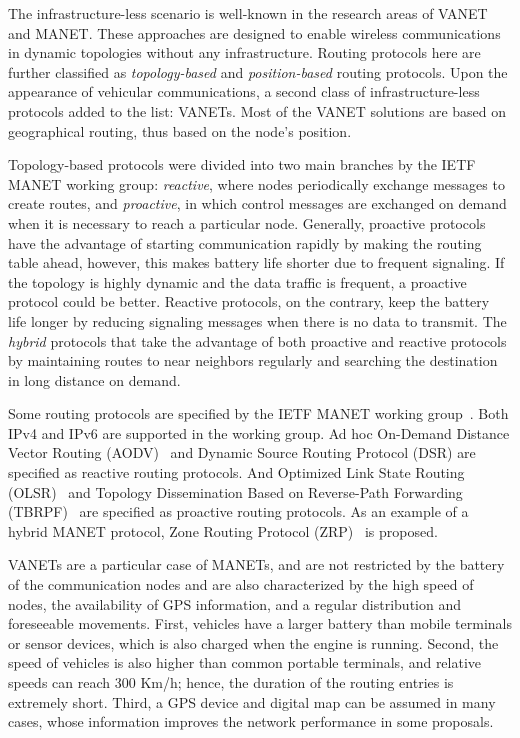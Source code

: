 \documentclass[fonts]{icst}
\begin{document}
The infrastructure-less scenario is well-known in the research areas of VANET and MANET. These approaches are designed to enable wireless
communications in dynamic topologies without any infrastructure. Routing
protocols here are further classified as \textit{topology-based} and
\textit{position-based} routing protocols. Upon the appearance of vehicular
communications, a second class of infrastructure-less protocols added to the
list: VANETs. Most of the VANET solutions are based on geographical routing,
thus based on the node's position. 

Topology-based protocols were divided into two main branches by the IETF MANET
working group: \textit{reactive}, where nodes periodically exchange messages to
create routes, and \textit{proactive}, in which control messages are exchanged on
demand when it is necessary to reach a particular node. Generally, proactive
protocols have the advantage of starting communication rapidly by making the
routing table ahead, however, this makes battery life shorter due to frequent
signaling. If the topology is highly dynamic and the data traffic is frequent, a
proactive protocol could be better. Reactive protocols, on the contrary, keep
the battery life longer by reducing signaling messages when there is no data to
transmit. The \textit{hybrid} protocols that take the advantage of both
proactive and reactive protocols by maintaining routes to near
neighbors regularly and searching the destination in long distance on demand.

Some routing protocols are specified by the IETF MANET working group~\cite{manetwg}.
Both IPv4 and IPv6 are supported in the working group. Ad hoc On-Demand Distance
Vector Routing (AODV)~\cite{rfc3561} and Dynamic Source Routing Protocol (DSR)
\cite{rfc4728} are specified as reactive routing protocols. And Optimized Link
State Routing (OLSR)~\cite{rfc3626} and Topology Dissemination Based on
Reverse-Path Forwarding (TBRPF)~\cite{rfc3684} are specified as proactive
routing protocols. As an example of a hybrid MANET protocol, Zone Routing Protocol
(ZRP)~\cite{ZRP} is proposed. 

VANETs are a particular case of MANETs, and are
not restricted by the battery of the communication nodes and are also characterized by the high speed of nodes, the availability of GPS information, and a regular distribution and foreseeable movements. First, vehicles have a larger battery than mobile terminals or sensor devices, which is also charged when the engine is
running. Second, the speed of vehicles is also higher than common portable
terminals, and relative speeds can reach 300 Km/h; hence, the duration of the
routing entries is extremely short. Third, a GPS device and digital map can be assumed in many
cases, whose information improves the network performance in some proposals.
\end{document}

